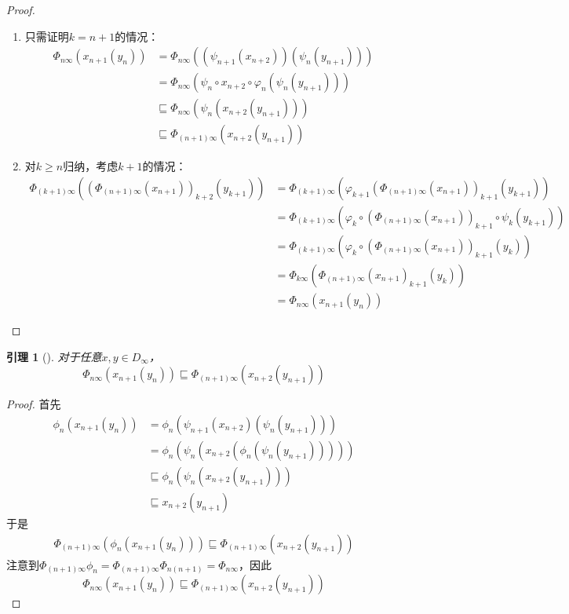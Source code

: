\documentclass{jams-l}
\newtheorem{lemma}[theorem]{引理}
\begin{document}
\begin{proof}
\begin{enumerate}
\item 只需证明\(k=n+1\)的情况：
\begin{align*}
\Phi_{n\infty}(x_{n+1}(y_n))&=\Phi_{n\infty}((\psi_{n+1}(x_{n+2}))(\psi_n(y_{n+1})))\\
&=\Phi_{n\infty}(\psi_n\circ x_{n+2}\circ\varphi_n(\psi_n(y_{n+1})))\\
&\sqsubseteq\Phi_{n\infty}(\psi_n(x_{n+2}(y_{n+1})))\\
&\sqsubseteq\Phi_{(n+1)\infty}(x_{n+2}(y_{n+1}))
\end{align*}
\item 对\(k\ge n\)归纳，考虑\(k+1\)的情况：
\begin{align*}
\Phi_{(k+1)\infty}((\Phi_{(n+1)\infty}(x_{n+1}))_{k+2}(y_{k+1}))
&=\Phi_{(k+1)\infty}(\varphi_{k+1}(\Phi_{(n+1)\infty}(x_{n+1}))_{k+1}(y_{k+1}))\\
&=\Phi_{(k+1)\infty}(\varphi_k\circ(\Phi_{(n+1)\infty}(x_{n+1}))_{k+1}\circ\psi_k(y_{k+1}))\\
&=\Phi_{(k+1)\infty}(\varphi_k\circ(\Phi_{(n+1)\infty}(x_{n+1}))_{k+1}(y_k))\\
&=\Phi_{k\infty}(\Phi_{(n+1)\infty}(x_{n+1})_{k+1}(y_k))\\
&=\Phi_{n\infty}(x_{n+1}(y_n))
\end{align*}
\end{enumerate}
\end{proof}

\begin{lemma}[]
\label{16.42}
对于任意\(x,y\in D_\infty\)，
\begin{equation*}
\Phi_{n\infty}(x_{n+1}(y_n))\sqsubseteq\Phi_{(n+1)\infty}(x_{n+2}(y_{n+1}))
\end{equation*}
\end{lemma}

\begin{proof}
首先
\begin{align*}
\phi_n(x_{n+1}(y_n))&=\phi_n(\psi_{n+1}(x_{n+2})(\psi_{n}(y_{n+1})))\\
&=\phi_n(\psi_n(x_{n+2}(\phi_n(\psi_n(y_{n+1})))))\\
&\sqsubseteq\phi_n(\psi_n(x_{n+2}(y_{n+1})))\\
&\sqsubseteq x_{n+2}(y_{n+1})
\end{align*}
于是
\begin{align*}
\Phi_{(n+1)\infty}(\phi_n(x_{n+1}(y_n)))\sqsubseteq\Phi_{(n+1)\infty}(x_{n+2}(y_{n+1}))
\end{align*}
注意到\(\Phi_{(n+1)\infty}\phi_n=\Phi_{(n+1)\infty}\Phi_{n(n+1)}=\Phi_{n\infty}\)，因此
\begin{equation*}
\Phi_{n\infty}(x_{n+1}(y_n))\sqsubseteq\Phi_{(n+1)\infty}(x_{n+2}(y_{n+1}))
\end{equation*}
\end{proof}
\end{document}
